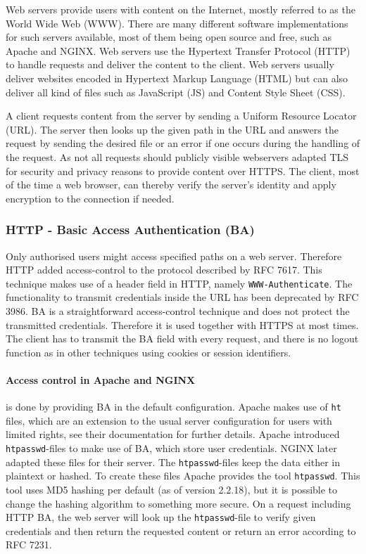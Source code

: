 Web servers provide users with content on the Internet, mostly referred to as
the World Wide Web (WWW). There are many different software implementations for
such servers available, most of them being open source and free, such as
Apache\cite{apacheweb} and NGINX\cite{nginxweb}. Web servers use the Hypertext
Transfer Protocol (HTTP) to handle requests and deliver the content to the
client. Web servers usually deliver websites encoded in Hypertext Markup
Language (HTML) but can also deliver all kind of files such as JavaScript (JS)
and Content Style Sheet (CSS).

A client requests content from the server by sending a Uniform Resource Locator
(URL). The server then looks up the given path in the URL and answers the
request by sending the desired file or an error if one occurs during the
handling of the request. As not all requests should publicly visible webservers
adapted TLS for security and privacy reasons to provide content over HTTPS. The
client, most of the time a web browser, can thereby verify the server's identity
and apply encryption to the connection if needed.

\subsubsection{HTTP - Basic Access Authentication (BA)}

Only authorised users might access specified paths on a web server. Therefore
HTTP added access-control to the protocol described by RFC 7617\cite{rfc7617}.
This technique makes use of a header field in HTTP, namely
\texttt{WWW-Authenticate}. The functionality to transmit credentials inside the
URL has been deprecated by RFC 3986\cite{rfc3986}. BA is a straightforward
access-control technique and does not protect the transmitted credentials.
Therefore it is used together with HTTPS at most times. The client has to
transmit the BA field with every request, and there is no logout function as in
other techniques using cookies or session identifiers.

\paragraph{Access control in Apache and NGINX} is done by providing BA in the
default configuration. Apache makes use of \texttt{ht} files, which
are an extension to the usual server configuration for users with limited
rights, see their documentation\cite{apacheauthdoc} for further details. Apache
introduced \texttt{htpasswd}-files to make use of BA, which store user
credentials. NGINX later adapted these files for their server. The
\texttt{htpasswd}-files keep the data either in plaintext or hashed. To create
these files Apache provides the tool \texttt{htpasswd}\cite{htpasswddoc}. This
tool uses MD5 hashing per default (as of version 2.2.18), but it is possible to
change the hashing algorithm to something more secure. On a request including
HTTP BA, the web server will look up the \texttt{htpasswd}-file to verify given
credentials and then return the requested content or return an error according
to RFC 7231\cite{rfc7231}.

